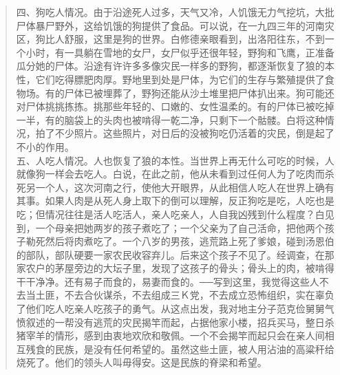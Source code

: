 \begin{quote}
四、狗吃人情况。由于沿途死人过多，天气又冷，人饥饿无力气挖坑，大批尸体暴尸野外，这给饥饿的狗提供了食品。可以说，在一九四三年的河南灾区，狗比人舒服，这里是狗的世界。白修德亲眼看到，出洛阳往东，不到一个小时，有一具躺在雪地的女尸，女尸似乎还很年轻，野狗和飞鹰，正准备瓜分她的尸体。沿途有许许多多像灾民一样多的野狗，都逐渐恢复了狼的本性，它们吃得膘肥肉厚。野地里到处是尸体，为它们的生存与繁殖提供了食物场。有的尸体已被埋葬了，野狗还能从沙土堆里把尸体扒出来。狗可能还对尸体挑挑拣拣。挑那些年轻的、口嫩的、女性温柔的。有的尸体已被吃掉一半，有的脑袋上的头肉也被啃得一乾二净，只剩下一个骷髅。白将这种情况，拍了不少照片。这些照片，对日后的没被狗吃仍活着的灾民，倒是起了不小的作用。\\

五、人吃人情况。人也恢复了狼的本性。当世界上再无什么可吃的时候，人就像狗一样会去吃人。白说，在此之前，他从未看到过任何人为了吃肉而杀死另一个人，这次河南之行，使他大开眼界，从此相信人吃人在世界上确有其事。如果人肉是从死人身上取下的倒可以理解，反正狗吃是吃，人吃也是吃；但情况往往是活人吃活人，亲人吃亲人，人自我凶残到什么程度？白见到，一个母亲把她两岁的孩子煮吃了；一个父亲为了自己活命，把他两个孩子勒死然后将肉煮吃了。一个八岁的男孩，逃荒路上死了爹娘，碰到汤恩伯的部队，部队硬要一家农民收容弃儿。后来这个孩子不见了。经调查，在那家农户的茅屋旁边的大坛子里，发现了这孩子的骨头；骨头上的肉，被啃得干干净净。还有易子而食的，易妻而食的。──写到这里，我觉得这些人不去当土匪，不去合伙谋杀，不去组成三Ｋ党，不去成立恐怖组织，实在辜负了他们吃人吃亲人吃孩子的勇气。从这点出发，我对地主分子范克俭舅舅气愤叙述的一帮没有逃荒的灾民揭竿而起，占据他家小楼，招兵买马，整日杀猪宰羊的情形，感到由衷地欢欣和敬佩。一个不会揭竿而起只会在亲人间相互残食的民族，是没有任何希望的。虽然这些土匪，被人用沾油的高粱秆给烧死了。他们的领头人叫毋得安。这是民族的脊梁和希望。\\
\end{quote}